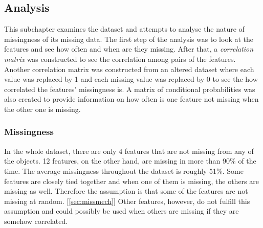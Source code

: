 \documentclass[11pt]{article}
\begin{document}
    \subsection{Analysis}
        \label{sec:analysis}
        This subchapter examines the dataset and attempts to analyse the nature of missingness of its missing data. The first step of the analysis was to look at the features and see how often and when are they missing. After that, a {\it correlation matrix} was constructed to see the correlation among pairs of the features. Another correlation matrix was constructed from an altered dataset where each value was replaced by 1 and each missing value was replaced by 0 to see the how correlated the features' missingness is. A matrix of conditional probabilities was also created to provide information on how often is one feature not missing when the other one is missing.
      \subsubsection{Missingness}
        In the whole dataset, there are only 4 features that are not missing from any of the objects. 12 features, on the other hand, are missing in more than 90\% of the time. The average missingness throughout the dataset is roughly 51\%. Some features are closely tied together and when one of them is missing, the others are missing as well. Therefore the assumption is that some of the features are not missing at random. [\ref{sec:missmech}] Other features, however, do not fulfill this assumption and could possibly be used when others are missing if they are somehow correlated.
\end{document}
